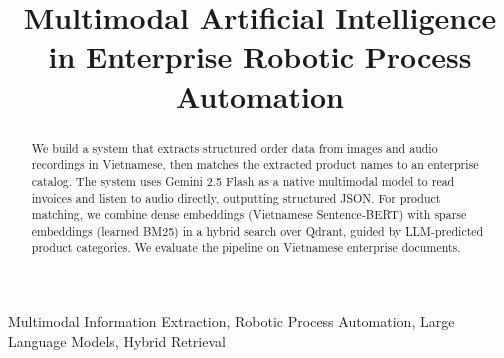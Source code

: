 \documentclass[conference]{IEEEtran}
\begin{document}
\title{Multimodal Artificial Intelligence in Enterprise Robotic Process Automation\\
}
 
\author{
}
\maketitle

\begin{abstract}
We build a system that extracts structured order data from images and audio recordings in Vietnamese, then matches the extracted product names to an enterprise catalog. The system uses Gemini 2.5 Flash as a native multimodal model to read invoices and listen to audio directly, outputting structured JSON. For product matching, we combine dense embeddings (Vietnamese Sentence-BERT) with sparse embeddings (learned BM25) in a hybrid search over Qdrant, guided by LLM-predicted product categories. We evaluate the pipeline on Vietnamese enterprise documents.
\end{abstract}

\begin{IEEEkeywords}
Multimodal Information Extraction, Robotic Process Automation, Large Language Models, Hybrid Retrieval
\end{IEEEkeywords}









\end{document}
